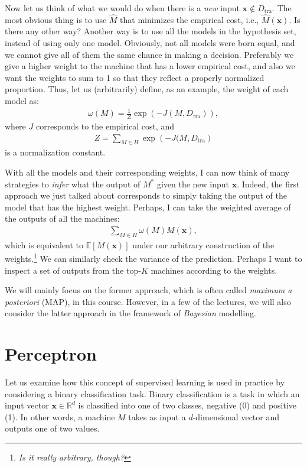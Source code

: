 \documentclass{report}
\newcommand{\vect}[1]{\mathbf{#1}}
\newcommand{\vx}[0]{\vect{x}}
\begin{document}
Now let us think of what we would do when there is a {\it new} input $\vx \notin
D_{\text{tra}}$. The most obvious thing is to use $\hat{M}$ that minimizes the
empirical cost, i.e., $\hat{M}(\vx)$. Is there any other way? Another way is to
use all the models in the hypothesis set, instead of using only one model.
Obviously, not all models were born equal, and we cannot give all of them the
same chance in making a decision. Preferably we give a higher weight to the
machine that has a lower empirical cost, and also we want the weights to sum to
1 so that they reflect a properly normalized proportion. Thus, let us
(arbitrarily) define, as an example, the weight of each model as:
\begin{align*}
    \omega(M) = \frac{1}{Z} \exp\left( -J(M, D_{\text{tra}} ) \right),
\end{align*}
where $J$ corresponds to the empirical cost, and 
\begin{align*}
    Z = \sum_{M \in H} \exp\left( -J(M, D_{\text{tra}} \right)
\end{align*}
is a normalization constant. 

With all the models and their corresponding weights, I can now think of many
strategies to {\it infer} what the output of $M^*$ given the new input $\vx$.
Indeed, the first approach we just talked about corresponds to simply taking the
output of the model that has the highest weight. Perhaps, I can take the
weighted average of the outputs of all the machines:
\begin{align*}
    \sum_{M \in H} \omega(M) M(\vx),
\end{align*}
which is equivalent to $\mathbb{E}\left[ M(\vx) \right]$ under our arbitrary
construction of the weights.\footnote{
    {\it Is it really arbitrary, though?}
} We can similarly check the variance of the prediction. Perhaps I want to
inspect a set of outputs from the top-$K$ machines according to the weights.

We will mainly focus on the former approach, which is often called {\it maximum
a posteriori} (MAP), in this course. However, in a few of the lectures, we will
also consider the latter approach in the framework of {\it Bayesian} modelling.


\section{Perceptron}
\label{sec:perceptron}

Let us examine how this concept of supervised learning is used in practice by
considering a binary classification task. Binary classification is a task in
which an input vector $\vx \in \mathbb{R}^d$ is classified into one of two
classes, negative (0) and positive (1). In other words, a machine $M$ takes as
input a $d$-dimensional vector and outputs one of two values. 
\end{document}
